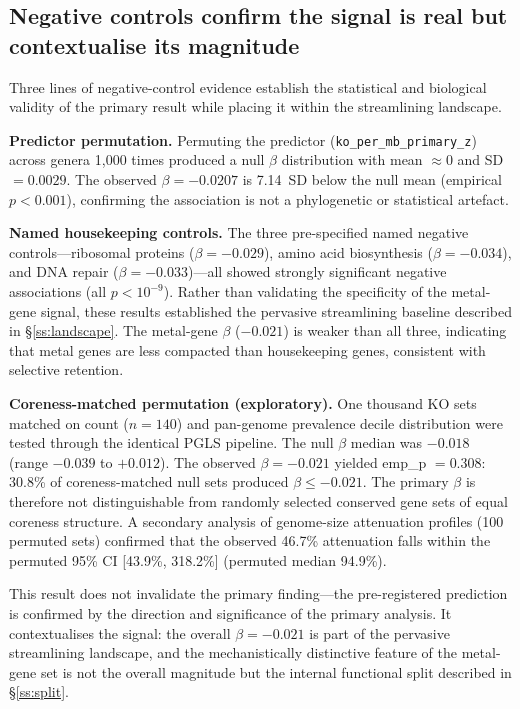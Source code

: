 \documentclass[times]{zHenriquesLab-StyleBioRxiv}
\begin{document}



\subsection{Negative controls confirm the signal is real but contextualise
its magnitude}
\label{ss:negctrl}

Three lines of negative-control evidence establish the statistical and
biological validity of the primary result while placing it within the
streamlining landscape.

\textbf{Predictor permutation.} Permuting the predictor
(\texttt{ko\_per\_mb\_primary\_z}) across genera 1,000 times produced a null
$\beta$ distribution with mean $\approx 0$ and SD $= 0.0029$. The observed
$\beta = -0.0207$ is 7.14~SD below the null mean (empirical $p < 0.001$),
confirming the association is not a phylogenetic or statistical artefact.

\textbf{Named housekeeping controls.} The three pre-specified named negative
controls---ribosomal proteins ($\beta = -0.029$), amino acid biosynthesis
($\beta = -0.034$), and DNA repair ($\beta = -0.033$)---all showed strongly
significant negative associations (all $p < 10^{-9}$). Rather than validating
the specificity of the metal-gene signal, these results established the
pervasive streamlining baseline described in \S\ref{ss:landscape}. The metal-gene
$\beta$ ($-0.021$) is weaker than all three, indicating that metal genes are
less compacted than housekeeping genes, consistent with selective retention.

\textbf{Coreness-matched permutation (exploratory).} One thousand KO
sets matched on count ($n = 140$) and pan-genome prevalence decile distribution
were tested through the identical PGLS pipeline. The null $\beta$ median was
$-0.018$ (range $-0.039$ to $+0.012$). The observed $\beta = -0.021$ yielded
emp\_p $= 0.308$: 30.8\% of coreness-matched null sets produced $\beta \leq
-0.021$. The primary $\beta$ is therefore not distinguishable from randomly
selected conserved gene sets of equal coreness structure. A secondary analysis
of genome-size attenuation profiles (100 permuted sets) confirmed that the
observed 46.7\% attenuation falls within the permuted 95\% CI [43.9\%, 318.2\%]
(permuted median 94.9\%).

This result does not invalidate the primary finding---the pre-registered prediction
is confirmed by the direction and significance of the primary analysis. It contextualises the
signal: the overall $\beta = -0.021$ is part of the pervasive streamlining
landscape, and the mechanistically distinctive feature of the metal-gene set is
not the overall magnitude but the internal functional split described in
\S\ref{ss:split}.
\end{document}
